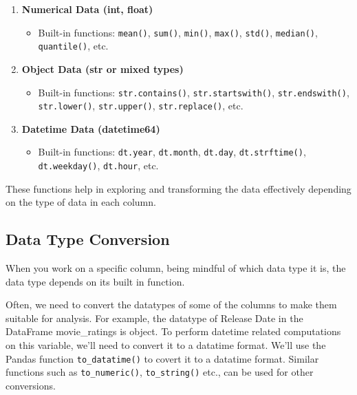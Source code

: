 \documentclass[
  letterpaper,
  DIV=11,
  numbers=noendperiod]{scrreprt}
\providecommand{\tightlist}{%
  \setlength{\itemsep}{0pt}\setlength{\parskip}{0pt}}\usepackage{longtable,booktabs,array}
\begin{document}
\begin{enumerate}
\def\labelenumi{\arabic{enumi}.}
\tightlist
\item
  \textbf{Numerical Data (int, float)}

  \begin{itemize}
  \tightlist
  \item
    Built-in functions: \texttt{mean()}, \texttt{sum()}, \texttt{min()},
    \texttt{max()}, \texttt{std()}, \texttt{median()},
    \texttt{quantile()}, etc.
  \end{itemize}
\item
  \textbf{Object Data (str or mixed types)}

  \begin{itemize}
  \tightlist
  \item
    Built-in functions: \texttt{str.contains()},
    \texttt{str.startswith()}, \texttt{str.endswith()},
    \texttt{str.lower()}, \texttt{str.upper()}, \texttt{str.replace()},
    etc.
  \end{itemize}
\item
  \textbf{Datetime Data (datetime64)}

  \begin{itemize}
  \tightlist
  \item
    Built-in functions: \texttt{dt.year}, \texttt{dt.month},
    \texttt{dt.day}, \texttt{dt.strftime()}, \texttt{dt.weekday()},
    \texttt{dt.hour}, etc.
  \end{itemize}
\end{enumerate}

These functions help in exploring and transforming the data effectively
depending on the type of data in each column.

\hypertarget{data-type-conversion}{%
\subsection{Data Type Conversion}\label{data-type-conversion}}

When you work on a specific column, being mindful of which data type it
is, the data type depends on its built in function.

Often, we need to convert the datatypes of some of the columns to make
them suitable for analysis. For example, the datatype of Release Date in
the DataFrame movie\_ratings is object. To perform datetime related
computations on this variable, we'll need to convert it to a datatime
format. We'll use the Pandas function \texttt{to\_datatime()} to covert
it to a datatime format. Similar functions such as
\texttt{to\_numeric()}, \texttt{to\_string()} etc., can be used for
other conversions.
\end{document}
